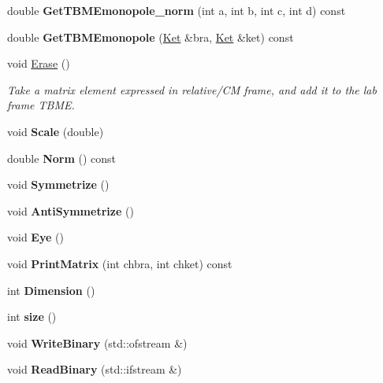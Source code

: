 \begin{DoxyCompactItemize}
\mbox{\label{classTwoBodyME_a4ae220acdb84f7b77e96304224fda0ba}} 
double {\bfseries Get\+T\+B\+M\+Emonopole\+\_\+norm} (int a, int b, int c, int d) const
\item 
\mbox{\label{classTwoBodyME_a5d53d53d4ba757974c2ffe6ebabd4911}} 
double {\bfseries Get\+T\+B\+M\+Emonopole} (\hyperlink{classKet}{Ket} \&bra, \hyperlink{classKet}{Ket} \&ket) const
\item 
void \hyperlink{classTwoBodyME_acd6f31eaef7652136740204ce5c4d226}{Erase} ()
\begin{DoxyCompactList}\small\item\em Take a matrix element expressed in relative/\+CM frame, and add it to the lab frame T\+B\+ME. \end{DoxyCompactList}\item 
\mbox{\label{classTwoBodyME_a5084b43918669e7876887ed44a145f3b}} 
void {\bfseries Scale} (double)
\item 
\mbox{\label{classTwoBodyME_a3fa4bbb2ab3359aa9d0d9035659c839b}} 
double {\bfseries Norm} () const
\item 
\mbox{\label{classTwoBodyME_aefe69c49a0fd79f35b9541539b1767ce}} 
void {\bfseries Symmetrize} ()
\item 
\mbox{\label{classTwoBodyME_a30f4d86bda647d3688b1b0aaa20efb2d}} 
void {\bfseries Anti\+Symmetrize} ()
\item 
\mbox{\label{classTwoBodyME_a3e5d862e3471a5090d3498cf0103d07c}} 
void {\bfseries Eye} ()
\item 
\mbox{\label{classTwoBodyME_aad1e0f5311c52fa7caf07694ead3a949}} 
void {\bfseries Print\+Matrix} (int chbra, int chket) const
\item 
\mbox{\label{classTwoBodyME_a51cc0901f3bab4c288a2be006f72513a}} 
int {\bfseries Dimension} ()
\item 
\mbox{\label{classTwoBodyME_ab13203f1f3d383fd241650f175cf5bb5}} 
int {\bfseries size} ()
\item 
\mbox{\label{classTwoBodyME_adb64bdb222c28be1b32467681111b1ec}} 
void {\bfseries Write\+Binary} (std\+::ofstream \&)
\item 
\mbox{\label{classTwoBodyME_a97fb923863bbaf7464115040e4e3cc3d}} 
void {\bfseries Read\+Binary} (std\+::ifstream \&)
\end{DoxyCompactItemize}
